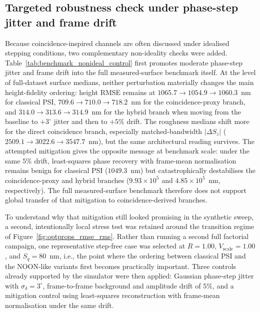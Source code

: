 \documentclass[photonics,article,submit,pdftex,moreauthors]{Definitions/mdpi}
\begin{document}
\subsection{Targeted robustness check under phase-step jitter and frame drift}
Because coincidence-inspired channels are often discussed under idealised stepping conditions, two complementary non-ideality checks were added. Table~\ref{tab:benchmark_nonideal_control} first promotes moderate phase-step jitter and frame drift into the full measured-surface benchmark itself. At the level of full-dataset surface medians, neither perturbation materially changes the main height-fidelity ordering: height RMSE remains at $1065.7 \rightarrow 1054.9 \rightarrow 1060.3$~nm for classical PSI, $709.6 \rightarrow 710.0 \rightarrow 718.2$~nm for the coincidence-proxy branch, and $314.0 \rightarrow 313.6 \rightarrow 314.9$~nm for the hybrid branch when moving from the baseline to $+3^\circ$ jitter and then to $+5\%$ drift. The roughness medians shift more for the direct coincidence branch, especially matched-bandwidth $|\Delta S_z|$ ($2509.1 \rightarrow 3022.6 \rightarrow 3547.7$~nm), but the same architectural reading survives. The attempted mitigation gives the opposite message at benchmark scale: under the same $5\%$ drift, least-squares phase recovery with frame-mean normalisation remains benign for classical PSI ($1049.3$~nm) but catastrophically destabilises the coincidence-proxy and hybrid branches ($9.93\times 10^5$ and $4.85\times 10^5$~nm, respectively). The full measured-surface benchmark therefore does not support global transfer of that mitigation to coincidence-derived branches.



To understand why that mitigation still looked promising in the synthetic sweep, a second, intentionally local stress test was retained around the transition regime of Figure~\ref{fig:optprops_rmse_rms}. Rather than running a second full factorial campaign, one representative step-free case was selected at $R=1.00$, $V_\mathrm{scale}=1.00$, and $S_q=80$~nm, i.e., the point where the ordering between classical PSI and the NOON-like variants first becomes practically important. Three controls already supported by the simulator were then applied: Gaussian phase-step jitter with $\sigma_\delta=3^\circ$, frame-to-frame background and amplitude drift of $5\%$, and a mitigation control using least-squares reconstruction with frame-mean normalisation under the same drift.
\end{document}
